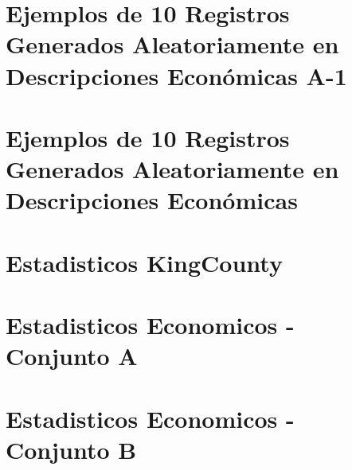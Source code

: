\section{Ejemplos de 10 Registros Generados Aleatoriamente en Descripciones Económicas A-1}
\label{ejemplo-10-aleatoreos-a}


\section{Ejemplos de 10 Registros Generados Aleatoriamente en Descripciones Económicas}
\label{ejemplo-10-aleatoreos-b}


\section{Estadisticos KingCounty}
\label{propiedades-estadisticas-kingCounty}


\section{Estadisticos Economicos - Conjunto A}
\label{propiedades-estadisticas-economicos-A}



\section{Estadisticos Economicos - Conjunto B}
\label{propiedades-estadisticas-economicos-B}


